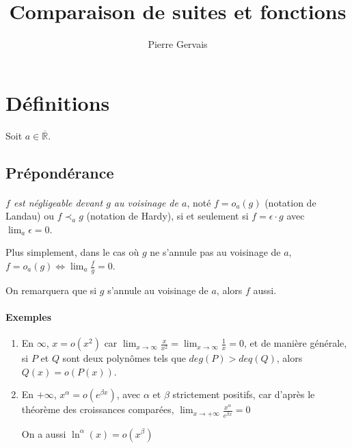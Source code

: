 \documentclass[]{article}
\title{Comparaison de suites et fonctions}
\author{Pierre Gervais}
\begin{document}
\maketitle

\section{Définitions}

Soit $a \in \overline{\mathbb{R}}$.

\subsection{Prépondérance}

\paragraph[Définition]{}
\textit{$f$ est négligeable devant $g$ au voisinage de $a$}, noté $f=o_a(g)$ (notation de Landau) ou $f \prec_a g$ (notation de Hardy), si et seulement si $f = \epsilon \cdot g$ avec $\displaystyle \lim_a \epsilon = 0$.

Plus simplement, dans le cas où $g$ ne s'annule pas au voisinage de $a$, $\displaystyle f=o_a(g) \Leftrightarrow \lim_a \frac{f}{g}=0$.

On remarquera que si $g$ s'annule au voisinage de $a$, alors $f$ aussi.

\paragraph{Exemples}
\begin{enumerate}
	\item En $\infty$, $x=o(x^2)$ car $\displaystyle  \lim_{x \to \infty}\frac{x}{x^2}=\lim_{x \to \infty}\frac{1}{x}=0$, et de manière générale, si $P$ et $Q$ sont deux polynômes tels que $deg(P) > deq(Q)$, alors $Q(x)=o(P(x))$.

    \item En $+ \infty$, $x^\alpha=o(e^{\beta x})$, avec $\alpha$ et $\beta$ strictement positifs, car d'après le théorème des croissances comparées, $\displaystyle \lim_{x \to +\infty} \frac{x^\alpha}{e^{\beta x}} = 0$
    
    On a aussi $\ln^\alpha(x)=o(x^\beta)$
\end{enumerate}
\end{document}
